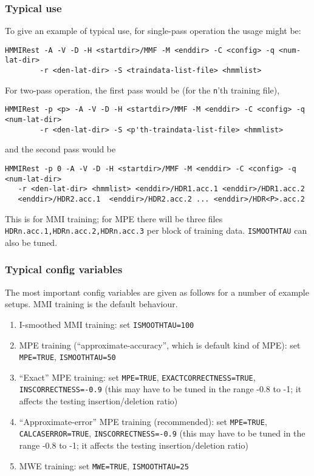 \subsubsection{Typical use}

To give an example of typical use, for single-pass operation the usage might be:
\begin{verbatim}
HMMIRest -A -V -D -H <startdir>/MMF -M <enddir> -C <config> -q <num-lat-dir> 
        -r <den-lat-dir> -S <traindata-list-file> <hmmlist>
\end{verbatim}
For two-pass operation, the first pass would be (for the \texttt{n}'th training file),
\begin{verbatim}
HMMIRest -p <p> -A -V -D -H <startdir>/MMF -M <enddir> -C <config> -q <num-lat-dir>
        -r <den-lat-dir> -S <p'th-traindata-list-file> <hmmlist>
\end{verbatim}
and the second pass would be
\begin{verbatim}
HMMIRest -p 0 -A -V -D -H <startdir>/MMF -M <enddir> -C <config> -q <num-lat-dir> 
   -r <den-lat-dir> <hmmlist> <enddir>/HDR1.acc.1 <enddir>/HDR1.acc.2 
   <enddir>/HDR2.acc.1  <enddir>/HDR2.acc.2 ... <enddir>/HDR<P>.acc.2 
\end{verbatim}
This is for MMI training; for MPE there will be three files \texttt{HDRn.acc.1,HDRn.acc.2,HDRn.acc.3}
per block of training data.  \texttt{ISMOOTHTAU} can also be tuned.

\subsubsection{Typical config variables}

The most important config variables are given as follows for a number of example setups.
MMI training is the default behaviour.
\begin{enumerate}  
   \item I-smoothed MMI training: set \texttt{ISMOOTHTAU=100}
   \item MPE training (``approximate-accuracy'', which is default kind of MPE): set \texttt{MPE=TRUE}, \texttt{ISMOOTHTAU=50}
   \item ``Exact'' MPE training: set \texttt{MPE=TRUE}, \texttt{EXACTCORRECTNESS=TRUE}, \texttt{INSCORRECTNESS=-0.9}
        (this  may have to be tuned in the range -0.8 to -1; it affects the testing 
        insertion/deletion ratio)
   \item ``Approximate-error'' MPE training (recommended): set \texttt{MPE=TRUE}, \texttt{CALCASERROR=TRUE}, \texttt{INSCORRECTNESS=-0.9}
        (this  may have to be tuned in the range -0.8 to -1; it affects the testing 
        insertion/deletion ratio)
   \item MWE training: set \texttt{MWE=TRUE}, \texttt{ISMOOTHTAU=25}
\end{enumerate}

